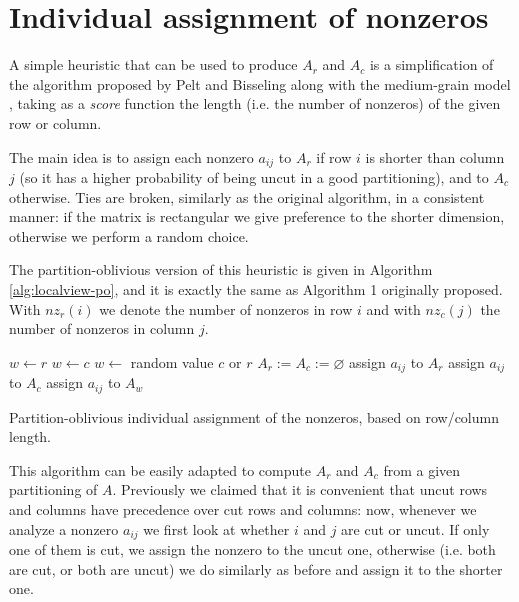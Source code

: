 \section{Individual assignment of nonzeros} \label{sec:localview}

A simple heuristic that can be used to produce $A_r$ and $A_c$ is a simplification of the algorithm proposed by Pelt and Bisseling along with the medium-grain model \cite[Alg.~1]{mediumgrain}, taking as a \emph{score} function the length (i.e. the number of nonzeros) of the given row or column.

The main idea is to assign each nonzero $a_{ij}$ to $A_r$ if row $i$ is shorter than column $j$ (so it has a higher probability of being uncut in a good partitioning), and to $A_c$ otherwise. Ties are broken, similarly as the original algorithm, in a consistent manner: if the matrix is rectangular we give preference to the shorter dimension, otherwise we perform a random choice.

The partition-oblivious version of this heuristic is given in Algorithm \ref{alg:localview-po}, and it is exactly the same as Algorithm 1 originally proposed. With $nz_r(i)$ we denote the number of nonzeros in row $i$ and with $nz_c(j)$ the number of nonzeros in column $j$.

\begin{algorithm}[h]
	\begin{algorithmic}
		\State
		\State $w \gets r$ 
		\State $w \gets c$
		\Else
		\State $w \gets$ random value $c$ or $r$
		\EndIf
		\State $A_r := A_c := \varnothing$
		\State assign $a_{ij}$ to $A_r$
		\State assign $a_{ij}$ to $A_c$
		\Else
		\State assign $a_{ij}$ to $A_w$
		\EndIf
		\EndFor
	\end{algorithmic}
	\caption{Partition-oblivious individual assignment of the nonzeros, based on row/column length.} \label{alg:localview-po}
\end{algorithm}

This algorithm can be easily adapted to compute $A_r$ and $A_c$ from a given partitioning of $A$. Previously we claimed that it is convenient that uncut rows and columns have precedence over cut rows and columns: now, whenever we analyze a nonzero $a_{ij}$ we first look at whether $i$ and $j$ are cut or uncut. If only one of them is cut, we assign the nonzero to the uncut one, otherwise (i.e. both are cut, or both are uncut) we do similarly as before and assign it to the shorter one.

